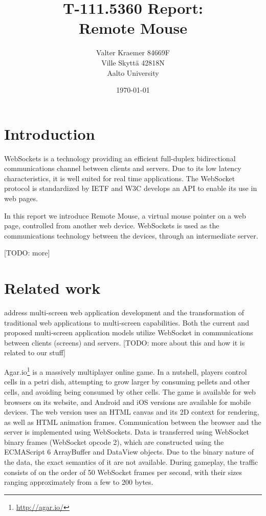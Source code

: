\documentclass[a4paper,english,twocolumn]{article}
\begin{document}
\title{T-111.5360 Report:\\[5mm]
Remote Mouse}

\author{Valter Kraemer 84669F \\
  Ville Skyttä 42818N \\
Aalto University}

\date{\today}

\maketitle


\section{Introduction}

WebSockets is a technology providing an efficient full-duplex
bidirectional communications channel between clients and servers. Due
to its low latency characteristics, it is well suited for real time
applications. The WebSocket protocol is standardized by IETF
\citep{rfc} and W3C \citep{w3c} develops an API to enable its use in
web pages.

In this report we introduce Remote Mouse, a virtual mouse pointer on a
web page, controlled from another web device. WebSockets is used as
the communications technology between the devices, through an
intermediate server.

[TODO: more]

\section{Related work}

\citet{bassbouss} address multi-screen web application development and
the transformation of traditional web applications to multi-screen
capabilities. Both the current and proposed multi-screen application
models utilize WebSocket in communications between clients (screens)
and servers. [TODO: more about this and how it is related to our stuff]

Agar.io\footnote{\url{http://agar.io/}} is a massively multiplayer
online game. In a nutshell, players control cells in a petri dish,
attempting to grow larger by consuming pellets and other cells, and
avoiding being consumed by other cells. The game is available for web
browsers on its website, and Android and iOS versions are available
for mobile devices. The web version uses an HTML canvas and its 2D
context for rendering, as well as HTML animation frames. Communication
between the browser and the server is implemented using
WebSockets. Data is transferred using WebSocket binary frames
(WebSocket opcode 2), which are constructed using the ECMAScript 6
ArrayBuffer and DataView objects. Due to the binary nature of the
data, the exact semantics of it are not available. During gameplay,
the traffic consists of on the order of 50 WebSocket frames per
second, with their sizes ranging approximately from a few to 200
bytes.
\end{document}

